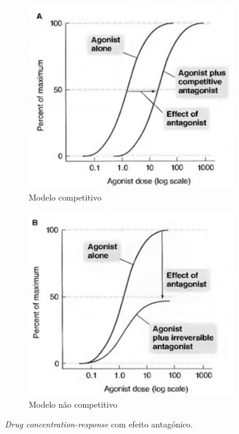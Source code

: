 \begin{figure}[ht] 
    \begin{subfigure}[b]{0.5\linewidth}
        \hfill
        \includegraphics[width=0.8\linewidth]{img/perguntas/P6/P6-Competitive.png}
        \vspace{1ex}
        \hspace*{7.5em}\begin{minipage}{0.5\linewidth}
            \caption{Modelo competitivo} 
            \label{fig:LABEL-competitive} 
        \end{minipage}
    \end{subfigure}%
    \quad
    \begin{subfigure}[b]{0.5\linewidth}
        \includegraphics[width=0.8\linewidth]{img/perguntas/P6/P6-NCompetitive.png} 
        \vspace{1ex}
        \hspace*{3.5em}\begin{minipage}{0.5\linewidth}
            \caption{Modelo não competitivo} 
            \label{fig:LABEL-ncompetitive} 
        \end{minipage}
    \end{subfigure}
    \caption{\textit{Drug concentration-response} com efeito antagónico\cite{10.1093/bjaceaccp/mkh049}.}
\end{figure}

